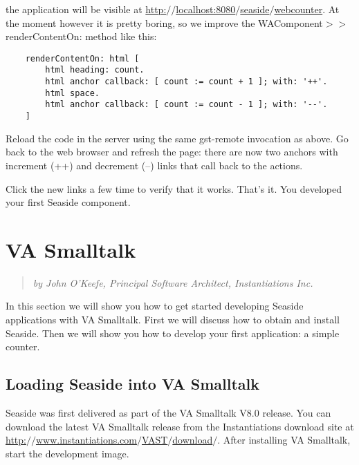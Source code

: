\documentclass[a4paper,10pt,twoside]{book}
\newenvironment{blockquote}%
	{\begin{quote}}
	{\end{quote}}
\newcommand{\ct}[1]{{\small\ttfamily\textup{#1}}}
\begin{document}
the application will be visible at \href{http://localhost:8080/seaside/webcounter}{http:$/$$/$localhost:8080$/$seaside$/$webcounter}. At the moment however it is pretty boring, so we improve the \ct{WAComponent$>$$>$renderContentOn:} method like this:

\begin{lstlisting}
    renderContentOn: html [
        html heading: count.
        html anchor callback: [ count := count + 1 ]; with: '++'.
        html space.
        html anchor callback: [ count := count - 1 ]; with: '--'.
    ]
\end{lstlisting}

Reload the code in the server using the same \ct{gst-remote} invocation as above. Go back to the web browser and refresh the page: there are now two anchors with increment (++) and decrement (--) links that call back to the actions.

Click the new links a few time to verify that it works. That's it. You developed your first Seaside component.

\chapter{VA Smalltalk}
\label{book:gettingstarted:vasmalltalk}

\begin{blockquote}
\textit{by John O'Keefe, Principal Software Architect, Instantiations Inc.}

\end{blockquote}

In this section we will show you how to get started developing Seaside applications with VA Smalltalk. First we will discuss how to obtain and install Seaside. Then we will show you how to develop your first application: a simple counter.

\section{Loading Seaside into VA Smalltalk}
\label{book:gettingstarted:vasmalltalk:installation}

Seaside was first delivered as part of the VA Smalltalk V8.0 release.  You can download the latest VA Smalltalk release from the Instantiations download site at \href{http://www.instantiations.com/VAST/download/}{http:$/$$/$www.instantiations.com$/$VAST$/$download$/$}. After installing VA Smalltalk, start the development image.
\end{document}
